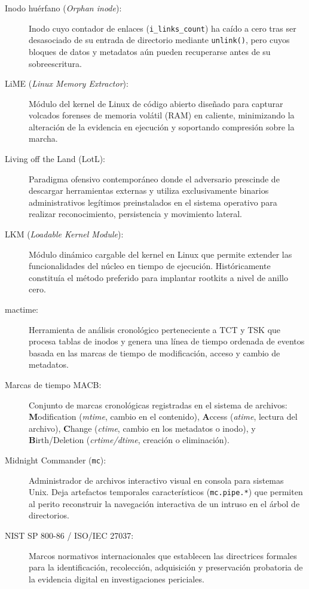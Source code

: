 \begin{description}
    \item[Inodo huérfano (\textit{Orphan inode}):] Inodo cuyo contador de enlaces (\texttt{i\_links\_count}) ha caído a cero tras ser desasociado de su entrada de directorio mediante \texttt{unlink()}, pero cuyos bloques de datos y metadatos aún pueden recuperarse antes de su sobreescritura.

    \item[LiME (\textit{Linux Memory Extractor}):] Módulo del kernel de Linux de código abierto diseñado para capturar volcados forenses de memoria volátil (RAM) en caliente, minimizando la alteración de la evidencia en ejecución y soportando compresión sobre la marcha.

    \item[Living off the Land (LotL):] Paradigma ofensivo contemporáneo donde el adversario prescinde de descargar herramientas externas y utiliza exclusivamente binarios administrativos legítimos preinstalados en el sistema operativo para realizar reconocimiento, persistencia y movimiento lateral.

    \item[LKM (\textit{Loadable Kernel Module}):] Módulo dinámico cargable del kernel en Linux que permite extender las funcionalidades del núcleo en tiempo de ejecución. Históricamente constituía el método preferido para implantar rootkits a nivel de anillo cero.

    \item[mactime:] Herramienta de análisis cronológico perteneciente a TCT y TSK que procesa tablas de inodos y genera una línea de tiempo ordenada de eventos basada en las marcas de tiempo de modificación, acceso y cambio de metadatos.

    \item[Marcas de tiempo MACB:] Conjunto de marcas cronológicas registradas en el sistema de archivos: \textbf{M}odification (\textit{mtime}, cambio en el contenido), \textbf{A}ccess (\textit{atime}, lectura del archivo), \textbf{C}hange (\textit{ctime}, cambio en los metadatos o inodo), y \textbf{B}irth/Deletion (\textit{crtime/dtime}, creación o eliminación).

    \item[Midnight Commander (\texttt{mc}):] Administrador de archivos interactivo visual en consola para sistemas Unix. Deja artefactos temporales característicos (\texttt{mc.pipe.*}) que permiten al perito reconstruir la navegación interactiva de un intruso en el árbol de directorios.

    \item[NIST SP 800-86 / ISO/IEC 27037:] Marcos normativos internacionales que establecen las directrices formales para la identificación, recolección, adquisición y preservación probatoria de la evidencia digital en investigaciones periciales.


\end{description}
